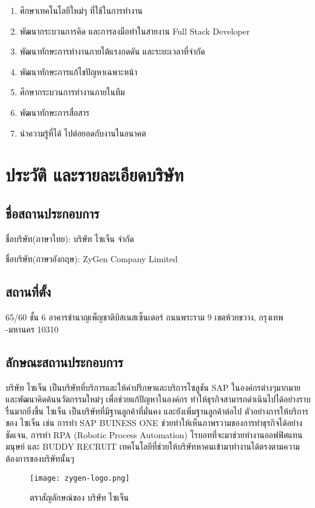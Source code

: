 \begin{enumerate}
  \item ศึกษาเทคโนโลยีใหม่ๆ ที่ใช้ในการทำงาน
  \item พัฒนากระบวนการคิด และการลงมือทำในสายงาน Full Stack Developer
  \item พัฒนาทักษะการทำงานภายใต้แรงกดดัน และระยะเวลาที่จำกัด
  \item พัฒนาทักษะการแก้ไขปัญหาเฉพาะหน้า
  \item ศึกษากระบวนการทำงานภายในทีม
  \item พัฒนาทักษะการสื่อสาร
  \item นำความรู้ที่ได้ ไปต่อยอดกับงานในอนาคต
\end{enumerate}

\section{ประวัติ และรายละเอียดบริษัท}

\subsection{ชื่อสถานประกอบการ}

ชื่อบริษัท(ภาษาไทย): บริษัท ไซเจ็น จำกัด

ชื่อบริษัท(ภาษาอังกฤษ): ZyGen Company Limited

\subsection{สถานที่ตั้ง}

65/60 ชั้น 6 อาคารชำนาญเพ็ญชาติบิสเนสเซ็นเตอร์ ถนนพระราม 9 เขตห้วยขวาง, กรุงเทพ -มหานคร 10310

\subsection{ลักษณะสถานประกอบการ}

บริษัท ไซเจ็น เป็นบริษัทที่บริการและให้คำปรึกษาและบริการโซลูชัน SAP ในองค์กรต่างๆมากมาย และพัฒนาคิดค้นนวัตกรรมใหม่ๆ เพื่อช่วยแก้ปัญหาในองค์กร ทำให้ธุรกิจสามารถดำเนินไปได้อย่างราบรื่นมากยิ่งขึ้น ไซเจ็น เป็นบริษัทที่มีฐานลูกค้าที่มั่นคง และยังเพิ่มฐานลูกค้าต่อไป ตัวอย่างการให้บริการของ ไซเจ็น เช่น การทำ SAP BUINESS ONE ช่วยทำให้เห็นภาพรวามของการทำธุรกิจได้อย่างชัดเจน,  การทำ RPA (Robotic Process Automation) โรบอทที่จะมาช่วยทำงานออฟฟิศแทนมนุษย์ และ BUDDY RECRUIT เทคโนโลยีที่ช่วยให้บริษัทหาคนเข้ามาทำงานได้ตรงตามความต้องการของบริษัทนั้นๆ

\begin{figure}[H]
  \centering
  \texttt{[image: zygen-logo.png]}
  \caption{ตราสัญลักษณ์ของ บริษัท ไซเจ็น}
  \label{Fig:zygen-logo}
\end{figure}

